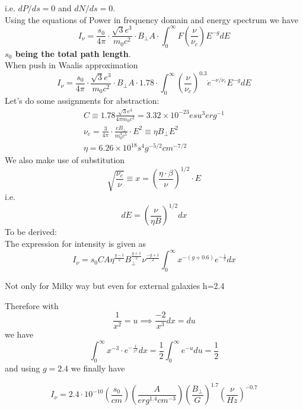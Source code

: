 \documentclass[11pt]{report}
\newcommand{\cbox}{tcolorbox}
\newcommand{\cc}[1]{\left({#1}\right)}
\begin{document}
i.e. $dP/ds=0$ and $dN/ds=0$.\\
Using the equations of Power in frequency domain and energy spectrum we have
\begin{equation}
I_\nu=\frac{s_0}{4\pi}\cdot \frac{\sqrt{3}e^3}{m_0c^2}\cdot B_{\perp} A \cdot \int^{\infty}_0 F\cc{\frac{\nu}{\nu_c}}E^{-g}dE
\end{equation}
\textbf{$s_0$ being the total path length}.\\
When push in Waalis approximation
\begin{equation}
I_\nu=\frac{s_0}{4\pi}\cdot \frac{\sqrt{3}e^3}{m_0c^2}\cdot B_{\perp} A \cdot 1.78 \cdot \int^{\infty}_0 \cc{\frac{\nu}{\nu_c}}^{0.3} \dot e^{-\nu/\nu_c}E^{-g}dE
\end{equation}
Let's do some assignments for abstraction:
\begin{eqnarray*}
C\equiv 1.78  \frac{\sqrt{3}e^3}{4 \pi m_0c^2}=3.32 \times 10^{-23}esu^3 erg^{-1}\\
\nu_c=\frac{3}{4\pi}\cdot\frac{eB_{\perp}}{m_0^3c^5}\cdot E^2\equiv \eta B_{\perp} E^2\\
\eta=6.26 \times 10^{18}s^4g^{-5/2}cm^{-7/2}
\end{eqnarray*}
We also make use of substitution
\begin{equation}
\sqrt{\frac{\nu_c}{\nu}}\equiv x =\cc{\frac{\eta \cdot \beta}{\nu}}^{1/2}\cdot E
\end{equation}
i.e.
\begin{equation}
dE=\cc{\frac{\nu}{\eta B}}^{1/2}dx
\end{equation}
To be derived:\\
The expression for intensity is given as
\begin{equation}
I_\nu=s_0 C A \eta^{\frac{g-1}{2}}B_{\perp}^{\frac{g+1}{2}}\nu^{\frac{-g+1}{2}}\int^\infty_0 x^{-(g+0.6)}e^{-\frac{1}{^2}}dx
\end{equation}
\begin{\cbox}
Not only for Milky way but even for external galaxies h=2.4
\end{\cbox}
Therefore with
\begin{equation}
\frac{1}{x^2}=u \implies \frac{-2}{x^3}dx=du
\end{equation}
we have
\begin{equation}
\int^\infty_0x^{-3}\cdot e^{-\frac{1}{x^2}}dx=\frac{1}{2}\int^\infty_0 e^{-u}du=\frac{1}{2}
\end{equation}
and using $g=2.4$ we finally have
\begin{\cbox}
\begin{equation}
I_\nu=2.4 \cdot 10^{-10}\cc{\frac{s_0}{cm}}\cc{\frac{A}{erg^{1.4}cm^{-3}}}\cc{\frac{B_\perp}{G}}^{1.7}\cc{\frac{\nu}{Hz}}^{-0.7}
\end{equation}
\end{\cbox}
\end{document}
